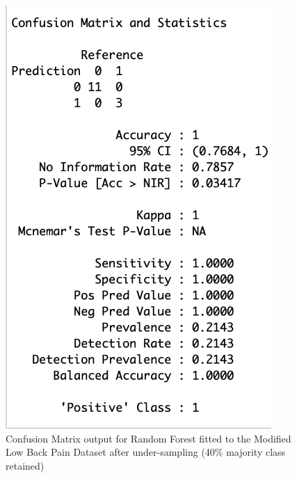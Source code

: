 \begin{figure}[!htbp]
\begin{minipage}{0.45\textwidth}
        \includegraphics[width=0.9\textwidth]{ThesisTemplate/appendix/images/Chapter5Appendix/ConfusionMatrix40/modLBP.png}
        \caption{Confusion Matrix output for Random Forest fitted to the Modified Low Back Pain Dataset after under-sampling (40\% majority class retained)}
        \label{fig:matrixmodLBP40}
    \end{minipage}
\end{figure}


